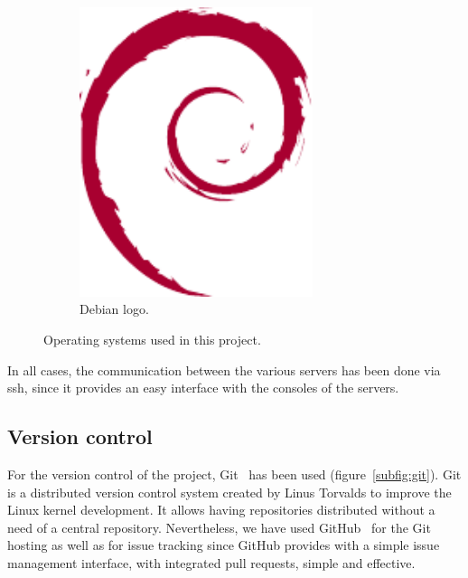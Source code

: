 \begin{figure}[!htbp]
\begin{subfigure}{0.3\textwidth}
		\includegraphics[width=0.75\textwidth]{fig/debian}
		\caption{Debian logo.}\label{subfig:debian}
	\end{subfigure}\quad
	\caption{Operating systems used in this project.}
\end{figure}

In all cases, the communication between the various servers has been done via \acrshort{ssh}, since
it provides an easy interface with the consoles of the servers.

\subsection{Version control}

For the version control of the project, Git~\cite{git_web} has been used (figure~\ref{subfig:git}).
Git is a distributed version control system created by Linus Torvalds to improve the Linux kernel
development. It allows having repositories distributed without a need of a central repository.
Nevertheless, we have used GitHub~\cite{github_web} for the Git hosting as well as for issue
tracking since GitHub provides with a simple issue management interface, with integrated pull
requests, simple and effective.

